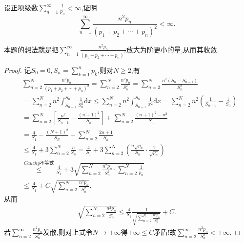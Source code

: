 \documentclass[../../main.tex]{subfiles}
\begin{document}
\begin{example}
设正项级数$\sum\limits_{n=1}^\infty \frac{1}{p_n}<\infty$,证明
$$\sum_{n=1}^\infty \frac{n^2 p_n}{(p_1+p_2+\cdots +p_n)^2}<\infty.$$
\end{example}
\begin{remark}
本题的想法就是把$\sum\limits_{n=1}^\infty \frac{n^2 p_n}{(p_1+p_2+\cdots +p_n)^2}$放大为阶更小的量,从而其收敛.
\end{remark}
\begin{proof}
记$S_0=0,S_n=\sum_{k=1}^n{p_k}$,则对$N\geqslant 2$,有
\begin{align*}
&\sum_{n=2}^N{\frac{n^2p_n}{(p_1+p_2+\cdots +p_n)^2}}=\sum_{n=2}^N{\frac{n^2p_n}{S_{n}^{2}}}=\sum_{n=2}^N{\frac{n^2\left( S_n-S_{n-1} \right)}{S_{n}^{2}}} \\
&=\sum_{n=2}^N{n^2\int_{S_{n-1}}^{S_n}{\frac{1}{S_{n}^{2}}\mathrm{d}x}}\leqslant \sum_{n=2}^N{n^2\int_{S_{n-1}}^{S_n}{\frac{1}{x^2}\mathrm{d}x}}=\sum_{n=2}^N{n^2\left( \frac{1}{S_{n-1}}-\frac{1}{S_n} \right)} \\
&=\sum_{n=2}^N{\left[ \frac{n^2}{S_{n-1}}-\frac{\left( n+1 \right) ^2}{S_n} \right]}+\sum_{n=2}^N{\frac{\left( n+1 \right) ^2-n^2}{S_n}} \\
&=\frac{4}{S_1}-\frac{\left( N+1 \right) ^2}{S_N}+\sum_{n=2}^N{\frac{2n+1}{S_n}} \\
&\leqslant \frac{4}{S_1}+3\sum_{n=2}^N{\frac{n}{S_n}}=\frac{4}{S_1}+3\sum_{n=2}^N{\left( \frac{n\sqrt{p_n}}{S_n}\cdot \frac{1}{\sqrt{p_n}} \right)} \\
&\overset{Cauchy\text{不等式}}{\leqslant}\frac{4}{S_1}+3\sqrt{\sum_{n=2}^N{\frac{n^2p_n}{S_{n}^{2}}}\cdot \sum_{n=2}^N{\frac{1}{p_n}}} \\
&\leqslant \frac{4}{S_1}+C\sqrt{\sum_{n=2}^N{\frac{n^2p_n}{S_{n}^{2}}}}.
\end{align*}
从而
\begin{align*}
\sqrt{\sum_{n=2}^N{\frac{n^2p_n}{S_{n}^{2}}}}\leqslant \frac{4}{S_1}\frac{1}{\sqrt{\sum\limits_{n=2}^N{\frac{n^2p_n}{S_{n}^{2}}}}}+C.
\end{align*}
若$\sum_{n=2}^{\infty}{\frac{n^2p_n}{S_{n}^{2}}}$发散,则对上式令$N\rightarrow +\infty$得$+\infty \leqslant C$矛盾!故$\sum_{n=2}^{\infty}{\frac{n^2p_n}{S_{n}^{2}}}<+\infty .$
\end{proof}
\end{document}
